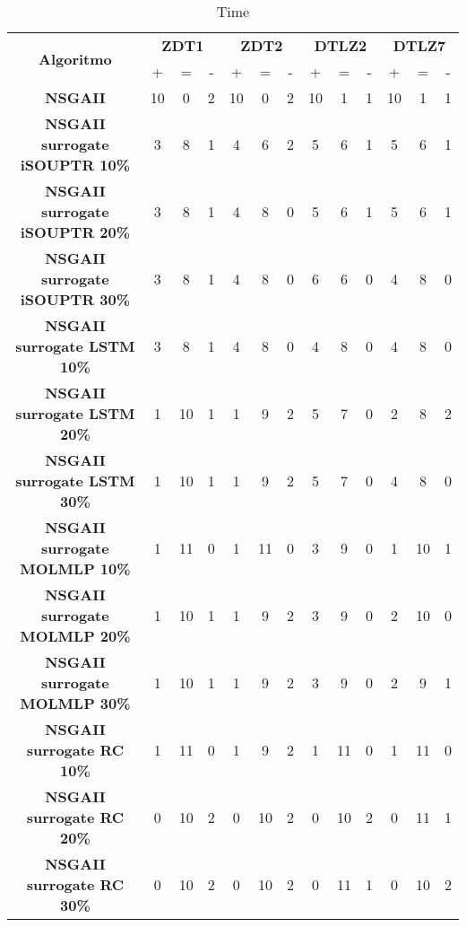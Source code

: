 \begin{table}[h]
\centering
\begin{tabular}{|c|ccc|ccc|ccc|ccc|}
\hline\multirow{2}{*}{\textbf{Algoritmo}} & \multicolumn{3}{c|}{\textbf{ZDT1}} & \multicolumn{3}{c|}{\textbf{ZDT2}} & \multicolumn{3}{c|}{\textbf{DTLZ2}} & \multicolumn{3}{c|}{\textbf{DTLZ7}} \\ \cline{2-13}& + & = & - & + & = & - & + & = & - & + & = & - \\ \hline
\textbf{NSGAII} & 10 & 0 & 2 & 10 & 0 & 2 & 10 & 1 & 1 & 10 & 1 & 1\\
\textbf{NSGAII surrogate iSOUPTR 10\%} & 3 & 8 & 1 & 4 & 6 & 2 & 5 & 6 & 1 & 5 & 6 & 1\\
\textbf{NSGAII surrogate iSOUPTR 20\%} & 3 & 8 & 1 & 4 & 8 & 0 & 5 & 6 & 1 & 5 & 6 & 1\\
\textbf{NSGAII surrogate iSOUPTR 30\%} & 3 & 8 & 1 & 4 & 8 & 0 & 6 & 6 & 0 & 4 & 8 & 0\\
\textbf{NSGAII surrogate LSTM 10\%} & 3 & 8 & 1 & 4 & 8 & 0 & 4 & 8 & 0 & 4 & 8 & 0\\
\textbf{NSGAII surrogate LSTM 20\%} & 1 & 10 & 1 & 1 & 9 & 2 & 5 & 7 & 0 & 2 & 8 & 2\\
\textbf{NSGAII surrogate LSTM 30\%} & 1 & 10 & 1 & 1 & 9 & 2 & 5 & 7 & 0 & 4 & 8 & 0\\
\textbf{NSGAII surrogate MOLMLP 10\%} & 1 & 11 & 0 & 1 & 11 & 0 & 3 & 9 & 0 & 1 & 10 & 1\\
\textbf{NSGAII surrogate MOLMLP 20\%} & 1 & 10 & 1 & 1 & 9 & 2 & 3 & 9 & 0 & 2 & 10 & 0\\
\textbf{NSGAII surrogate MOLMLP 30\%} & 1 & 10 & 1 & 1 & 9 & 2 & 3 & 9 & 0 & 2 & 9 & 1\\
\textbf{NSGAII surrogate RC 10\%} & 1 & 11 & 0 & 1 & 9 & 2 & 1 & 11 & 0 & 1 & 11 & 0\\
\textbf{NSGAII surrogate RC 20\%} & 0 & 10 & 2 & 0 & 10 & 2 & 0 & 10 & 2 & 0 & 11 & 1\\
\textbf{NSGAII surrogate RC 30\%} & 0 & 10 & 2 & 0 & 10 & 2 & 0 & 11 & 1 & 0 & 10 & 2\\
\hline
\end{tabular}
\caption{Time}
\label{tabla:comparacion_Time}
\end{table}